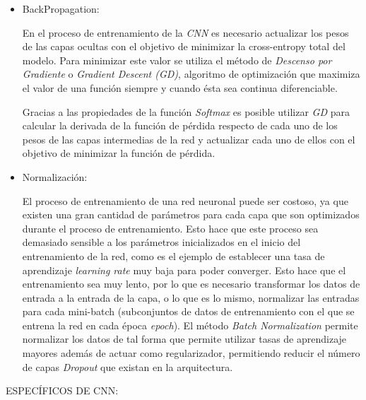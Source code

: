 \begin{itemize}
                \item BackPropagation:

                    En el proceso de entrenamiento de la \textit{CNN} es necesario actualizar los pesos de las capas ocultas con el objetivo de minimizar la cross-entropy total del modelo. Para minimizar este valor se utiliza el método de \textit{Descenso por Gradiente} o \textit{Gradient Descent (GD)}, algoritmo de optimización que maximiza el valor de una función siempre y cuando ésta sea continua diferenciable.

                    Gracias a las propiedades de la función \textit{Softmax} es posible utilizar \textit{GD} para calcular la derivada de la función de pérdida respecto de cada uno de los pesos de las capas intermedias de la red y actualizar cada uno de ellos con el objetivo de minimizar la función de pérdida.

                \item Normalización:

                    El proceso de entrenamiento de una red neuronal puede ser costoso, ya que existen una gran cantidad de parámetros para cada capa que son optimizados durante el proceso de entrenamiento. Esto hace que este proceso sea demasiado sensible a los parámetros inicializados en el inicio del entrenamiento de la red, como es el ejemplo de establecer una tasa de aprendizaje \textit{learning rate} muy baja para poder converger. Esto hace que el entrenamiento sea muy lento, por lo que es necesario transformar los datos de entrada a la entrada de la capa, o lo que es lo mismo, normalizar las entradas para cada mini-batch (subconjuntos de datos de entrenamiento con el que se entrena la red en cada época \textit{epoch}). El método \textit{Batch Normalization} \cite{BatchNormalization} permite normalizar los datos de tal forma que permite utilizar tasas de aprendizaje mayores además de actuar como regularizador, permitiendo reducir el número de capas \textit{Dropout} que existan en la arquitectura.

            \end{itemize}


            ESPECÍFICOS DE CNN:

